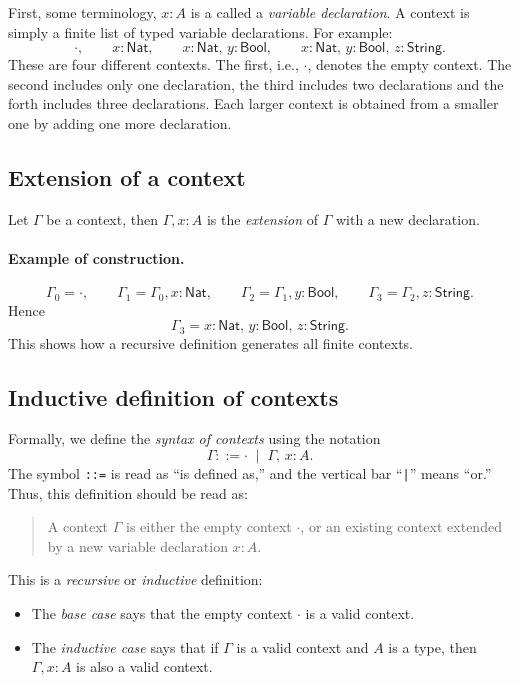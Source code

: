 \documentclass{article}
\newcommand{\Nat}{\mathsf{Nat}}
\newcommand{\Bool}{\mathsf{Bool}}
\newcommand{\String}{\mathsf{String}}
\newcommand{\emptyctx}{\cdot}              %
\begin{document}
First, some terminology, \(x : A\) is a called a \emph{variable declaration}.
A context is simply a finite list of typed variable declarations.  
For example:
\[
\emptyctx, \qquad
x : \Nat, \qquad
x : \Nat,\, y : \Bool, \qquad
x : \Nat,\, y : \Bool,\, z : \String.
\]
These are four different contexts. The first, i.e., $\cdot$, denotes the empty context. The second includes only one declaration, the third includes two declarations and the forth includes three declarations. Each larger context is obtained from a smaller one by adding one more declaration.

\subsection*{Extension of a context}
Let $\Gamma$ be a context, then \(\Gamma, x : A\) is the \emph{extension} of \(\Gamma\) with a new declaration.

\paragraph{Example of construction.}
\[
\Gamma_0 = \emptyctx, \qquad
\Gamma_1 = \Gamma_0, x : \Nat, \qquad
\Gamma_2 = \Gamma_1, y : \Bool, \qquad
\Gamma_3 = \Gamma_2, z : \String.
\]
Hence
\[
\Gamma_3 = x : \Nat,\, y : \Bool,\, z : \String.
\]
This shows how a recursive definition generates all finite contexts.

\subsection*{Inductive definition of contexts}

Formally, we define the \emph{syntax of contexts} using the notation
\[
\Gamma ::= \emptyctx \;\mid\; \Gamma,\, x : A.
\]
The symbol \texttt{::=} is read as “is defined as,” and the vertical bar “\texttt{|}” means “or.”  
Thus, this definition should be read as:

\begin{quote}
A context \(\Gamma\) is either the empty context \(\emptyctx\),  
or an existing context extended by a new variable declaration \(x : A\).
\end{quote}

This is a \emph{recursive} or \emph{inductive} definition:  
\begin{itemize}
  \item The \emph{base case} says that the empty context \(\emptyctx\) is a valid context.
  \item The \emph{inductive case} says that if \(\Gamma\) is a valid context and \(A\) is a type, then \(\Gamma, x : A\) is also a valid context.
\end{itemize}
\end{document}
